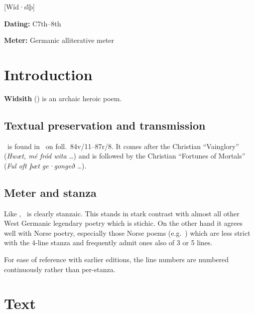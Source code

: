 [Wíd·si̇́þ]

\begin{flushright}%
\textbf{Dating:} C7th--8th \parencite{Neidorf2013}

\textbf{Meter:} Germanic alliterative meter
\end{flushright}%

\section{Introduction}

\textbf{Widsith} (\Widsith) is an archaic heroic poem.

\subsection{Textual preservation and transmission}

\Widsith\ is found in \ExeterBook\ on foll.~84v/11--87r/8.  It comes after the Christian “Vainglory” (\emph{Hwæt, mé fród wita} \dots) and is followed by the Christian “Fortunes of Mortals” (\emph{Ful oft þæt ge·gongeð} \dots).

\subsection{Meter and stanza}

Like , \Widsith\ is clearly stanzaic.  This stands in stark contrast with almost all other West Germanic legendary poetry which is stichic.  On the other hand it agrees well with Norse poetry, especially those Norse poems (e.g.~) which are less strict with the 4-line stanza and frequently admit ones also of 3 or 5 lines.

For ease of reference with earlier editions, the line numbers are numbered continuously rather than per-stanza.

\sectionline

\newpage

\section{Text}

